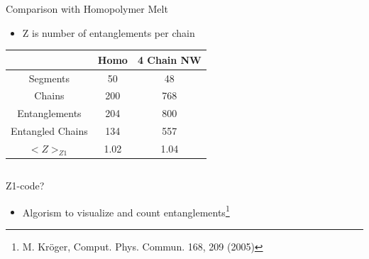 \documentclass[12pt, dvipdfmx]{beamer}
\begin{document}
\begin{frame}
\begin{columns}[onlytextwidth][c]
            \begin{block}{Comparison with Homopolymer Melt}
                \begin{itemize}
                    \item Z is number of entanglements per chain
                \end{itemize}
                \scriptsize
                \begin{center}
                    \begin{tabular}{c||c|c} \hline
                        &Homo & 4 Chain NW \\ \hline \hline
                        Segments& 50& 48 \\ \hline
                        Chains & 200& 768 \\ \hline
                        Entanglements& 204& 800\\ \hline
                        Entangled Chains&134&557 \\ \hline
                        \alert{$<Z>_{Z1}$}&\alert{1.02}& \alert{1.04}\\ \hline
                    \end{tabular}
                \end{center}
            \end{block}
        \end{columns}
    \begin{alertblock}{Z1-code?}
        \begin{itemize}
            \item Algorism to visualize and count entanglements\footnote{
                M. Kröger, Comput. Phys. Commun. 168, 209 (2005)
            }
        \end{itemize}
    \end{alertblock}
\end{frame}
\end{document}
